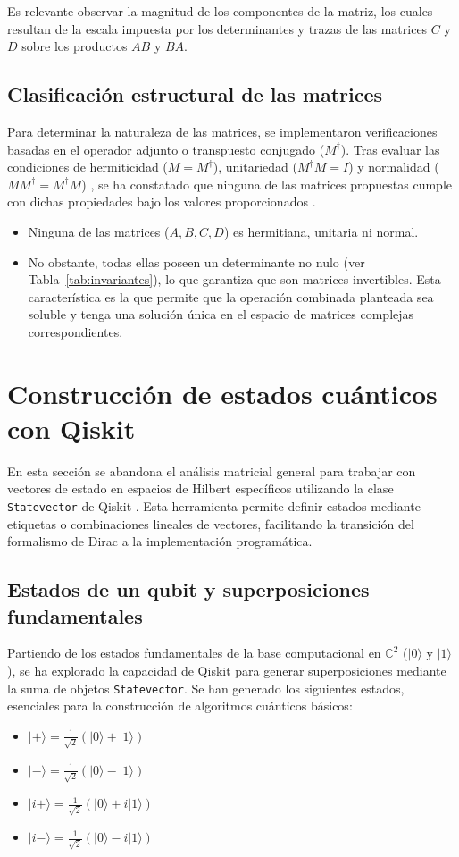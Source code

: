 \documentclass[11pt,a4paper,spanish]{book}
\begin{document}
Es relevante observar la magnitud de los componentes de la matriz, los cuales resultan de la escala impuesta por los determinantes y trazas de las matrices $C$ y $D$ sobre los productos $AB$ y $BA$.

\subsection{Clasificación estructural de las matrices}
Para determinar la naturaleza de las matrices, se implementaron verificaciones basadas en el operador adjunto o transpuesto conjugado ($M^\dagger$). Tras evaluar las condiciones de hermiticidad ($M = M^\dagger$), unitariedad ($M^\dagger M = I$) y normalidad ($M M^\dagger = M^\dagger M$) , se ha constatado que ninguna de las matrices propuestas cumple con dichas propiedades bajo los valores proporcionados \citep{nielsen2010}.

\begin{itemize}
    \item Ninguna de las matrices ($A, B, C, D$) es hermitiana, unitaria ni normal.
    \item No obstante, todas ellas poseen un determinante no nulo (ver Tabla~\ref{tab:invariantes}), lo que garantiza que son matrices invertibles. Esta característica es la que permite que la operación combinada planteada sea soluble y tenga una solución única en el espacio de matrices complejas correspondientes.
\end{itemize}
\section{Construcción de estados cuánticos con Qiskit}
En esta sección se abandona el análisis matricial general para trabajar con vectores de estado en espacios de Hilbert específicos utilizando la clase \texttt{Statevector} de Qiskit \citep{qiskit2023}. Esta herramienta permite definir estados mediante etiquetas o combinaciones lineales de vectores, facilitando la transición del formalismo de Dirac a la implementación programática.

\subsection{Estados de un qubit y superposiciones fundamentales}
Partiendo de los estados fundamentales de la base computacional en $\mathbb{C}^2$ ($|0\rangle$ y $|1\rangle$), se ha explorado la capacidad de Qiskit para generar superposiciones mediante la suma de objetos \texttt{Statevector}. Se han generado los siguientes estados, esenciales para la construcción de algoritmos cuánticos básicos:
\begin{itemize}
    \item $|+\rangle = \frac{1}{\sqrt{2}}(|0\rangle + |1\rangle)$
    \item $|-\rangle = \frac{1}{\sqrt{2}}(|0\rangle - |1\rangle)$
    \item $|i+\rangle = \frac{1}{\sqrt{2}}(|0\rangle + i|1\rangle)$
    \item $|i-\rangle = \frac{1}{\sqrt{2}}(|0\rangle - i|1\rangle)$
\end{itemize}
\end{document}
